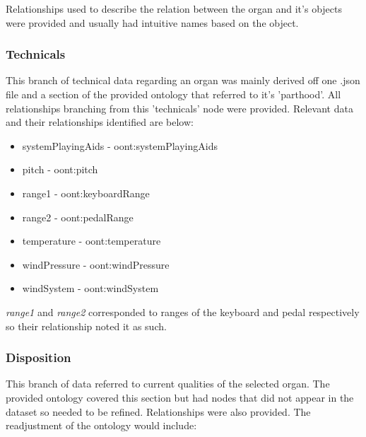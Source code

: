 Relationships used to describe the relation between the organ and it's objects were provided and usually had intuitive names based on the object. 

\subsubsection{Technicals}
\hspace*{0.5cm} This branch of technical data regarding an organ was mainly derived off one .json file and a section of the provided ontology that referred to it's 'parthood'. All relationships branching from this 'technicals' node were provided. Relevant data and their relationships identified are below:

\vspace{-0.1cm}
\begin{itemize}
    \itemsep0em 
    \item systemPlayingAids - oont:systemPlayingAids
    \vspace{-0.05cm}
    \item pitch - oont:pitch
    \vspace{-0.05cm}
    \item range1 -  oont:keyboardRange
    \vspace{-0.05cm}
    \item range2 - oont:pedalRange
    \vspace{-0.05cm}
    \item temperature - oont:temperature
    \vspace{-0.05cm}
    \item windPressure - oont:windPressure
    \vspace{-0.05cm}
    \item windSystem - oont:windSystem
\end{itemize}

\textit{range1} and \textit{range2} corresponded to ranges of the keyboard and pedal respectively so their relationship noted it as such. 

\subsubsection{Disposition}
\hspace*{0.5cm} This branch of data referred to current qualities of the selected organ. The provided ontology covered this section but had nodes that did not appear in the dataset so needed to be refined. Relationships were also provided. The readjustment of the ontology would include:

